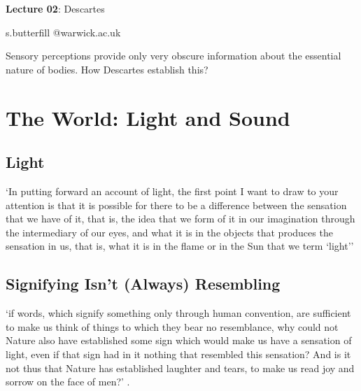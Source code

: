 \documentclass[12pt]{extarticle}
\date{}
\makeatletter
\def \ititle {Descartes}
\def \isubtitle {Lecture 02}
\def \iemail{s.butterfill @warwick.ac.uk}
\makeatother
\begin{document}
\begin{multicols*}{3}

\setlength\footnotesep{1em}









      
\def \ititle {Lecture 02}
 
\def \isubtitle {Descartes}
 
\begin{center}
 
{\Large
 
\textbf{\ititle}: \isubtitle
 
}
 
 
 
\iemail %
 
\end{center}
 

Sensory perceptions provide only very obscure information about the essential nature of bodies.
How Descartes establish this?

 
\section{The World: Light and Sound}

\subsection{Light}
‘In putting forward an account of light, the first point I want to draw to your attention  is that it is possible for there to be a difference between the sensation that we have of it,  that is, the idea that we form of it in our imagination through the intermediary of our eyes,  and what it is in the objects that produces the sensation in us, that is, what it is in the flame or in the Sun that we term ‘light’’ 
\citep[][p. 81 (AT XI:3)]{descartes:1998_world}
 
\subsection{Signifying Isn’t (Always) Resembling}
‘if words, which signify something only through human convention, are sufficient to make us think of
things to which they bear no resemblance, why could not Nature also have established some sign
which would make us have a sensation of light, even if that sign had in it nothing that resembled
this sensation? And is it not thus that Nature has established laughter and tears, to make us read
joy and sorrow on the face of men?’ 
\citep[][p.~81 (AT XI:4)]{descartes:1998_world}.
 

\end{multicols*}
\end{document}
